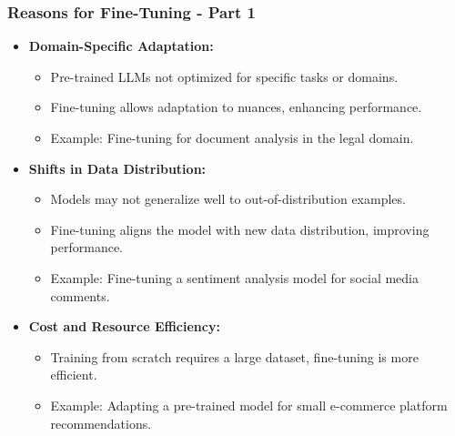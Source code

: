 \begin{frame}[fragile]\frametitle{Reasons for Fine-Tuning - Part 1}
  \begin{itemize}
    \item \textbf{Domain-Specific Adaptation:}
      \begin{itemize}
        \item Pre-trained LLMs not optimized for specific tasks or domains.
        \item Fine-tuning allows adaptation to nuances, enhancing performance.
        \item Example: Fine-tuning for document analysis in the legal domain.
      \end{itemize}
    \item \textbf{Shifts in Data Distribution:}
      \begin{itemize}
        \item Models may not generalize well to out-of-distribution examples.
        \item Fine-tuning aligns the model with new data distribution, improving performance.
        \item Example: Fine-tuning a sentiment analysis model for social media comments.
      \end{itemize}
    \item \textbf{Cost and Resource Efficiency:}
      \begin{itemize}
        \item Training from scratch requires a large dataset, fine-tuning is more efficient.
        \item Example: Adapting a pre-trained model for small e-commerce platform recommendations.
      \end{itemize}
  \end{itemize}
\end{frame}

